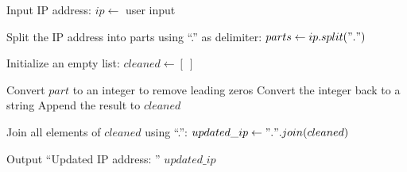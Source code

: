 \begin{algorithm}
\caption{Remove Leading Zeros from an IP Address}
\begin{algorithmic}[1]

\STATE Input IP address:
\STATE $ip \gets$ user input

\STATE Split the IP address into parts using ``.'' as delimiter:
\STATE $parts \gets ip.split(".")$

\STATE Initialize an empty list:
\STATE $cleaned \gets [\ ]$

    \STATE Convert $part$ to an integer to remove leading zeros
    \STATE Convert the integer back to a string
    \STATE Append the result to $cleaned$
\ENDFOR

\STATE Join all elements of $cleaned$ using ``.'':
\STATE $updated\_ip \gets ".".join(cleaned)$

\STATE Output ``Updated IP address: '' $updated\_ip$

\end{algorithmic}
\end{algorithm}